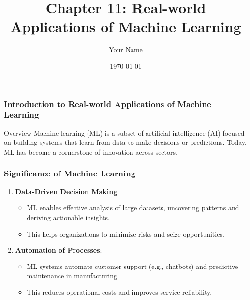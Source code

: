 \documentclass{beamer}
\title{Chapter 11: Real-world Applications of Machine Learning}
\author{Your Name}
\institute{Your Institution}
\date{\today}
\begin{document}
\frame{\titlepage}

\begin{frame}[fragile]
    \frametitle{Introduction to Real-world Applications of Machine Learning}
    \begin{block}{Overview}
        Machine learning (ML) is a subset of artificial intelligence (AI) focused on building systems that learn from data to make decisions or predictions. Today, ML has become a cornerstone of innovation across sectors.
    \end{block}
\end{frame}

\begin{frame}[fragile]
    \frametitle{Significance of Machine Learning}
    \begin{enumerate}
        \item \textbf{Data-Driven Decision Making}:
            \begin{itemize}
                \item ML enables effective analysis of large datasets, uncovering patterns and deriving actionable insights.
                \item This helps organizations to minimize risks and seize opportunities.
            \end{itemize}
        \item \textbf{Automation of Processes}:
            \begin{itemize}
                \item ML systems automate customer support (e.g., chatbots) and predictive maintenance in manufacturing.
                \item This reduces operational costs and improves service reliability.
            \end{itemize}
    \end{enumerate}
\end{frame}
\end{document}
